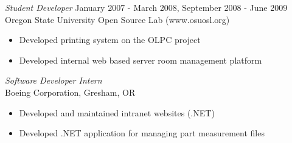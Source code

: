 \documentclass[margin]{res}
\begin{document}
\begin{resume}
                {\sl Student Developer} \hfill            January 2007 - March 2008, September 2008 - June 2009 \\
                Oregon State University Open Source Lab (www.osuosl.org)
                 \begin{itemize}  \itemsep -2pt %
                 \item Developed printing system on the OLPC project
				 \item Developed internal web based server room management platform
                 \end{itemize}

                {\sl Software Developer Intern} \hfill         \\
                Boeing Corporation, Gresham, OR
                  \begin{itemize}
                   \item Developed and maintained intranet websites (.NET)
				   \item Developed .NET application for managing part measurement files
                   \end{itemize} 
 

\end{resume}
\end{document}
